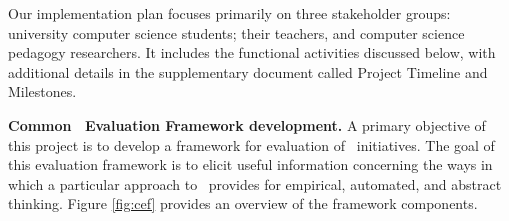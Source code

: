 
Our implementation plan focuses primarily on three stakeholder groups: university
computer science students; their teachers, and computer science pedagogy researchers. 
It includes the functional activities discussed below, with additional details in 
the supplementary document called Project Timeline and Milestones.


{\bf Common \eCT\ Evaluation Framework development.}  A primary objective
of this project is to develop a framework for evaluation of \eCT\
initiatives.  The goal of this evaluation framework is to elicit useful
information concerning the ways in which a particular approach to \eCT\
provides for empirical, automated, and abstract thinking. Figure
\ref{fig:cef} provides an overview of the framework components.

